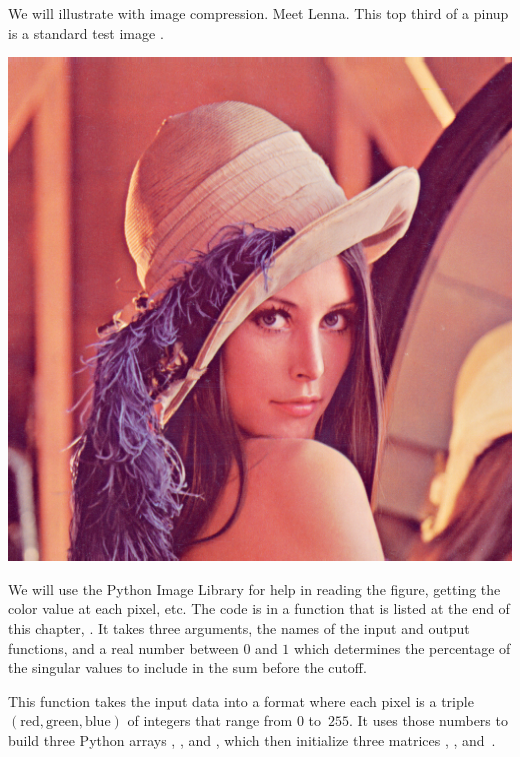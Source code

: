 We will illustrate with image compression.
Meet Lenna.
This top third of a pinup is a standard test image
\cite{wiki:Lenna}.
\begin{center}
  \includegraphics{Lenna.png} %
\end{center}

We will use the Python Image Library for help in reading the figure, 
getting the color value at each pixel, etc.
The code is in a function that is listed at the end of this chapter,
.
It takes three arguments, the names of the input and output functions, and
a real number between $0$ and $1$ which determines the percentage 
of the singular values to include in the sum before the cutoff.

This function takes the input data into a format where each
pixel is a triple 
$(\text{red}, \text{green},\text{blue})$ of integers that range from 
$0$ to~$255$.
It uses those numbers to build 
three Python arrays , ,
and , which then initialize 
three \Sage{} matrices ,
, and~.

